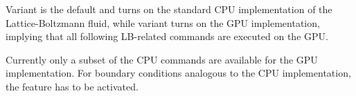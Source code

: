 Variant  is the default and turns on the standard CPU
implementation of the Lattice-Boltzmann fluid, while variant
 turns on the GPU implementation, implying that all
following LB-related commands are executed on the GPU.

Currently only a subset of the CPU commands are available for the GPU
implementation.  For boundary conditions analogous to the CPU
implementation, the feature  has to be
activated.

